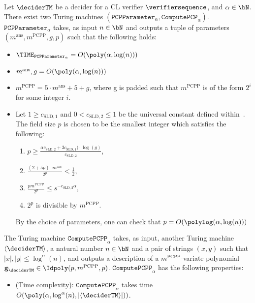 \begin{theorem} \label{thm:classicalPCPP}
Let $\deciderTM$ be a decider for a CL verifier $\verifiersequence$, and  $\alpha \in \bN$. There exist two Turing machines $(\mathtt{PCPParameter}_{\alpha}, \mathtt{ComputePCP}_{\alpha})$. $\mathtt{PCPParameter}_{\alpha}$ takes, as input $n \in \bN$ and outputs a tuple of parameters $(m^{\text{ans}},m^{\text{PCPP}}, g, p)$ such that the following holds:
\begin{itemize}
	\item $\TIME_{\mathtt{PCPParameter}_{\alpha}} = O(\poly(\alpha, \log(n)))$
	\item $m^{\text{ans}}, g = O(\poly(\alpha, \log(n)))$ 
	\item $m^{\text{PCPP}} = 5 \cdot m^{\text{ans}} + 5 + g$, where g is padded such that $m^{\text{PCPP}}$ is of the form $2^i$ for some integer $i$. 
	\item Let $1 \geq c_{\text{SLD},1}$ and $0 < c_{\text{SLD},2} \leq 1$ be the universal constant defined within~. The field size $p$ is chosen to be the smallest integer which satisfies the following:
	\begin{enumerate}
		\item $p \geq \frac{\alpha c_{\text{SLD},2} + 3 c_{\text{SLD},1} ) \cdot \log(g)}{c_{\text{SLD},2}}$,
		\item $\frac{(2 + 5p) \cdot m^{\text{ans}}}{2^p} < \frac{1}{2}$,
		\item $\frac{p m^{\text{PCPP}}}{2^p} \leq s^{-  c_{\text{SLD},2} \alpha}$,
		\item $2^p$ is divisible by $m^{\text{PCPP}}$. 
	\end{enumerate}
	By the choice of parameters, one can check that $p = O(\polylog(\alpha, \log(n)))$ 
\end{itemize}
The Turing machine $\mathtt{ComputePCPP}_{\alpha}$ takes, as input, another Turing machine $\langle \deciderTM \rangle$, a natural number $n \in \bN$ and a pair of strings $(x,y)$ such that $|x|, |y| \leq \log^{\alpha}(n)$, and outputs a description of a $m^{\text{PCPP}}$-variate polynomial $\textbf{g}_{\deciderTM} \in \Idpoly(p, m^{\text{PCPP}},p)$. $\mathtt{ComputePCPP}_{\alpha}$ has the following properties:
\begin{itemize}
	\item (Time complexity): $\mathtt{ComputePCPP}_{\alpha}$ takes time $O(\poly(\alpha, \log^{\alpha}(n), | \langle \deciderTM \rangle |))$. 

\end{itemize}
\end{theorem}
